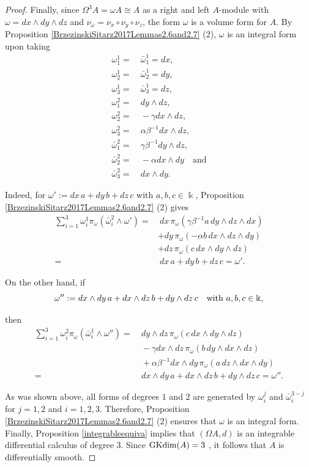 \documentclass{amsart}
\theoremstyle{definition}
\theoremstyle{remark}
\numberwithin{equation}{section}
\begin{document}
\begin{proof}
Finally, since $\Omega^3A = \omega A\cong A$ as a right and left $A$-module with $\omega=dx\wedge dy \wedge dz$ and $\nu_{\omega}=\nu_{x}\circ\nu_{y}\circ\nu_{z}$, the form $\omega$ is a volume form for $A$. By Proposition \ref{BrzezinskiSitarz2017Lemmas2.6and2.7} (2), $\omega$ is an integral form upon taking
\begin{align*}
\omega_1^1  = &\ \bar{\omega}_1^1 = dx, \\  
\omega_2^1 = &\ \bar{\omega}_2^1 = dy, \\
\omega_3^1 = &\ \bar{\omega}_3^1 = dz, \\
\omega_1^2 = &\ dy\wedge dz, \\
\omega_2^2 = &\ -\gamma dx\wedge dz, \\ 
\omega_3^2 = &\ \alpha\beta^{-1}dx\wedge dz, \\
\bar{\omega}_1^2 = &\ \gamma \beta^{-1}dy\wedge dz, \\
\bar{\omega}_2^2 = &\ -\alpha dx\wedge dy \quad \text{and} \\ 
\bar{\omega}_3^2 = &\ dx\wedge dy.
\end{align*}

Indeed, for $\omega' := dx\,a + dy\,b + dz\, c$ with $a, b, c \in \Bbbk$, Proposition \ref{BrzezinskiSitarz2017Lemmas2.6and2.7} (2) gives
\begin{align*}
    \sum_{i=1}^{3}\omega_{i}^{1}\pi_{\omega}(\bar{\omega}_i^{2}\wedge \omega') = &\ dx\,\pi_{\omega}(\gamma\beta^{-1}a\,dy\wedge dz\wedge dx) \\
    & + dy\,\pi_{\omega}(-\alpha b\,dx\wedge dz\wedge dy) \\
    & + dz\,\pi_{\omega}(c\,dx\wedge dy\wedge dz) \\
    = &\ dx\,a+dy\,b+dz\,c = \omega'.
\end{align*}

On the other hand, if 
$$
\omega'' := dx\wedge dy\, a+dx\wedge dz\,b+dy\wedge dz\,c \quad {\rm with} \, \, a, b, c\in \Bbbk,
$$ 

then
\begin{align*}
\sum_{i=1}^{3}\omega_{i}^{2}\pi_{\omega}(\bar{\omega}_i^{1}\wedge \omega'') = &\  dy\wedge dz\,\pi_{\omega}(c\,dx\wedge dy \wedge dz) \\
&\ - \gamma dx\wedge dz\,\pi_{\omega}(b\,dy\wedge dx\wedge dz) \\
    &\ + \alpha\beta^{-1}dx\wedge dy\,\pi_{\omega}(a\,dz \wedge dx \wedge dy) \\ 
    = &\ dx\wedge dy\,a+dx\wedge dz\,b+dy\wedge dz\,c = \omega''.
\end{align*}

As was shown above, all forms of degrees $1$ and $2$ are generated by $\omega_i^j$ and $\bar{\omega}_i^{3-j}$ for $j=1,2$ and $i=1,2,3$. Therefore, Proposition \ref{BrzezinskiSitarz2017Lemmas2.6and2.7} (2) ensures that $\omega$ is an integral form. Finally, Proposition \ref{integrableequiva} implies that $(\Omega A, d)$ is an integrable differential calculus of degree $3$. Since ${\rm GKdim}(A) = 3$ \cite[Section 8.7]{Fajardoetal2020}, it follows that $A$ is differentially smooth.
\end{proof}
\end{document}
